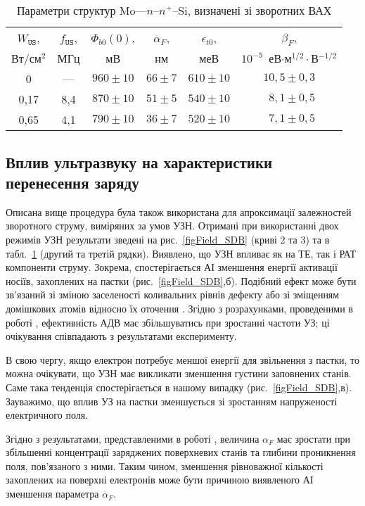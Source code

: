 \begin{table}
\caption{Параметри структур Mo---$n$--$n^+$--Si, визначені зі зворотних ВАХ}
\label{tabSDBParZv}
\centering
\begin{tabular}{|c|c|c|c|c|c|}
\hline
$W_\mathtt{US}$, &$f_\mathtt{US}$,&$\Phi_{b0}(0)$,&$\alpha_F$,&$\epsilon_{t0}$,&$\beta_F$,\\
Вт/см$^2$&МГц&мВ&нм&меВ&$10^{-5}$~еВ$\cdot$м$^{1/2}\cdot$В$^{-1/2}$\\\hline
0&---&$960\pm10$&$66\pm7$&$610\pm10$&$10,5\pm0,3$\\\hline
0,17&8,4&$870\pm10$&$51\pm5$&$540\pm10$&$\;\:8,1\pm0,5$\\\hline
0,65&4,1&$790\pm10$&$36\pm7$&$520\pm10$&$\;\:7,1\pm0,5$\\\hline
\end{tabular}
\end{table}



\subsection{Вплив ультразвуку на характеристики перенесення заряду}

Описана вище процедура була також використана для апроксимації залежностей зворотного струму, виміряних за умов УЗН.
Отримані при використанні двох режимів УЗН результати зведені на рис.~\ref{figField_SDB} (криві 2 та 3) та в табл.~\ref{tabSDBParZv} (другий та третій рядки).
Виявлено, що УЗН впливає як на ТЕ, так і РАТ компоненти струму.
Зокрема, спостерігається АІ зменшення енергії активації носіїв, захоплених на пастки (рис.~\ref{figField_SDB},б).
Подібний ефект може бути зв'язаний зі зміною заселеності коливальних рівнів дефекту \cite{Pavlovich} або зі зміщенням домішкових
атомів відносно їх оточення \cite{Korotchenkov1995}.
Згідно з розрахунками, проведеними в роботі \cite{Pavlovich}, ефективність АДВ має збільшуватись при зростанні частоти УЗ;
ці очікування співпадають з результатами експерименту.

В свою чергу, якщо електрон потребує меншої енергії для звільнення з пастки,
то можна очікувати, що УЗН має викликати зменшення густини заповнених станів.
Саме така тенденція спостерігається в нашому випадку (рис.~\ref{figField_SDB},в).
Зауважимо, що вплив УЗ на пастки зменшується зі зростанням напруженості електричного поля.

Згідно з результатами, представленими в роботі \cite{Em:Parker},
величина $\alpha_F$ має зростати при збільшенні концентрації заряджених поверхневих станів та
глибини проникнення поля, пов'язаного  з ними.
Таким чином, зменшення рівноважної кількості захоплених на поверхні електронів може бути причиною виявленого АІ
зменшення параметра $\alpha_F$.

